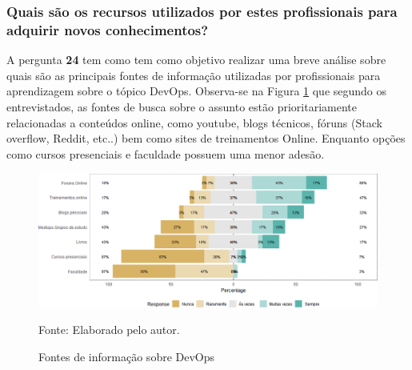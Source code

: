 \documentclass[twoside,english,brazilian]{UNISINOSartigo}
\newcommand{\source}[1]{\caption*{Fonte: {#1}} }
\begin{document}
\subsubsection{Quais são os recursos  utilizados por estes profissionais para adquirir novos conhecimentos?}
A pergunta \textbf{24} tem como tem como objetivo realizar uma breve análise sobre quais são as principais fontes de informação utilizadas por profissionais para aprendizagem sobre o tópico DevOps. Observa-se na Figura \ref{fig:fontesConhecimento} que segundo os entrevistados, as fontes de busca sobre o assunto estão prioritariamente relacionadas a conteúdos online, como youtube, blogs técnicos, fóruns (Stack overflow,  Reddit, etc..) bem como sites de treinamentos Online. Enquanto opções como cursos presenciais e faculdade possuem uma menor adesão.
\begin{figure}[H]
    \centering
    \caption{Fontes de informação sobre DevOps}
       \includegraphics[scale=.5]{imagens/questao24.png}
       \source{Elaborado pelo autor.}
    \label{fig:fontesConhecimento}
\end{figure}
\end{document}

